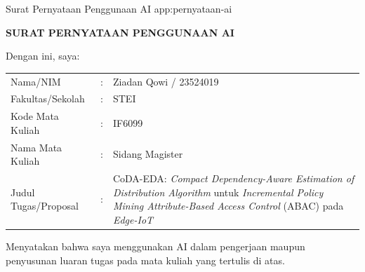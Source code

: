 
\thesisappendixpage
  {Surat Pernyataan Penggunaan AI}
  {app:pernyataan-ai}

\begingroup

\fontsize{10pt}{12pt}\selectfont
\setlength{\parindent}{0pt}
\setlength{\parskip}{0pt}
\setlength{\tabcolsep}{4pt}
\renewcommand{\arraystretch}{1.15}


\begin{center}
    \textbf{SURAT PERNYATAAN PENGGUNAAN AI}
\end{center}

\vspace{0.2cm}

Dengan ini, saya:

\vspace{0.1cm}


\begin{tabularx}{\textwidth}{
    @{}
    p{3.3cm}
    p{0.3cm}
    X
    @{}
}
Nama/NIM
    & : & Ziadan Qowi / 23524019 \\[0.18cm]

Fakultas/Sekolah
    & : & STEI \\[0.18cm]

Kode Mata Kuliah
    & : & IF6099 \\[0.18cm]

Nama Mata Kuliah
    & : & Sidang Magister \\[0.18cm]

Judul Tugas/Proposal
    & : & CoDA-EDA: \textit{Compact Dependency-Aware Estimation of Distribution Algorithm} untuk \textit{Incremental Policy Mining Attribute-Based Access Control} (ABAC) pada \textit{Edge-IoT}
\end{tabularx}

\vspace{0.25cm}

Menyatakan bahwa saya menggunakan AI dalam
pengerjaan maupun penyusunan luaran tugas pada mata kuliah yang tertulis
di atas.

\vspace{0.25cm}

